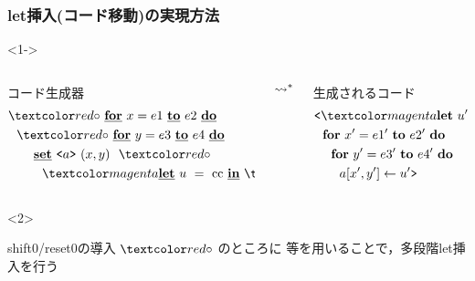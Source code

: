 \begin{frame}
  \frametitle{let挿入(コード移動)の実現方法}

  \begin{visibleenv}<1->
    \begin{columns}
      \begin{column}{0.5\textwidth}%
        コード生成器
        \begin{align*}
          & \red{\circ}~ \cfordo{x = e1}{e2} \\
          & ~~\red{\circ}~ \cfordo{y = e3}{e4} \\
          & ~~~~~~\caryset{\code{a}}{(x,y)}~ \red{\circ}~ \\
          & ~~~~~~~~\magenta{\cLet ~u ~= ~\text{cc} ~\cIn}~ \red{\circ}~ \text{u}
        \end{align*}
      \end{column}
      $\leadsto^*$
      \begin{column}{0.5\textwidth}%
        生成されるコード
        \begin{align*}
          & \cbra \magenta{\Let ~u' ~= ~\text{cc}' ~\In} \\
          & ~~\fordo{x' = e1'}{e2'} \\
          & ~~~~\fordo{y' = e3'}{e4'} \\
          & ~~~~~~\aryset{a}{x',y'}{u'} \cket
        \end{align*}
      \end{column}
    \end{columns}
  \end{visibleenv}

  \begin{visibleenv}<2>
    \begin{exampleblock}{shift0/reset0の導入}
      $\red{\circ}$ のところに  等を用いることで，多段階let挿入を行う
    \end{exampleblock}
  \end{visibleenv}
\end{frame}



